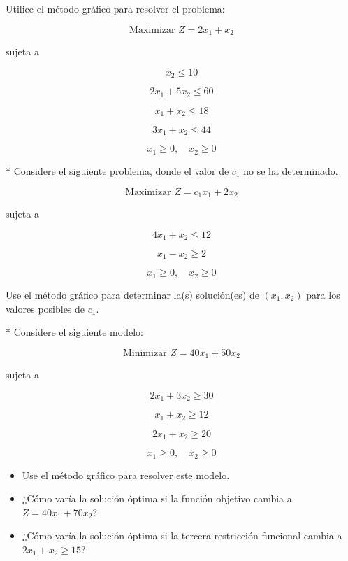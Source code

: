 \begin{Quest}
Utilice el m\'etodo gr\'afico para resolver el problema:

\[
\text{Maximizar } Z = 2x_1 + x_2
\]

sujeta a

\[
x_2 \le 10
\]

\[
2x_1 + 5x_2 \le 60
\]

\[
x_1 + x_2 \le 18
\]

\[
3x_1 + x_2 \le 44
\]

\[
x_1 \ge 0,\quad x_2 \ge 0
\]

\end{Quest}


\begin{Quest}*\label{Pregunta8}
Considere el siguiente problema, donde el valor de $c_1$ no se ha determinado.

\[
\text{Maximizar } Z = c_1 x_1 + 2x_2
\]

sujeta a

\[
4x_1 + x_2 \le 12
\]

\[
x_1 - x_2 \ge 2
\]

\[
x_1 \ge 0, \quad x_2 \ge 0
\]

Use el m\'etodo gr\'afico para determinar la(s) soluci\'on(es) de $(x_1,x_2)$ para los valores posibles de $c_1$.



\end{Quest}


\begin{Quest}*\label{Pregunta9}
Considere el siguiente modelo:

\[
\text{Minimizar } Z = 40x_1 + 50x_2
\]

sujeta a

\[
2x_1 + 3x_2 \ge 30
\]

\[
x_1 + x_2 \ge 12
\]

\[
2x_1 + x_2 \ge 20
\]

\[
x_1 \ge 0, \quad x_2 \ge 0
\]

\begin{itemize}
\item[a)] Use el m\'etodo gr\'afico para resolver este modelo.
\item[b)] ¿C\'omo var\'ia la soluci\'on \'optima si la funci\'on objetivo cambia a $Z = 40x_1 + 70x_2$?
\item[c)] ¿C\'omo var\'ia la soluci\'on \'optima si la tercera restricci\'on funcional cambia a $2x_1 + x_2 \ge 15$?
\end{itemize}
\end{Quest}

